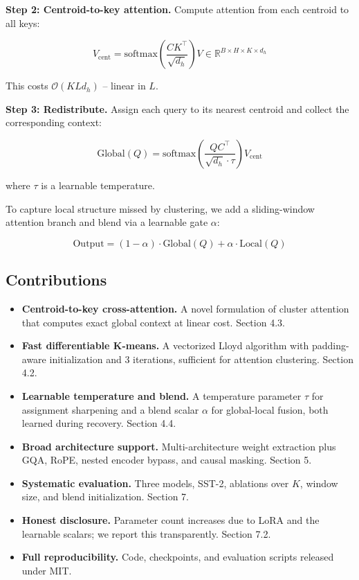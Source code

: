 \textbf{Step 2: Centroid-to-key attention.} Compute attention from each centroid 
to all keys:

\[
V_{\text{cent}} = \text{softmax}\!\left(\frac{C K^\top}{\sqrt{d_h}}\right) V \in \mathbb{R}^{B \times H \times K \times d_h}
\]

This costs $\mathcal{O}(K L d_h)$ -- linear in $L$.

\textbf{Step 3: Redistribute.} Assign each query to its nearest centroid and 
collect the corresponding context:

\[
\text{Global}(Q) = \text{softmax}\!\left(\frac{Q C^\top}{\sqrt{d_h} \cdot \tau}\right) V_{\text{cent}}
\]

where $\tau$ is a learnable temperature.

To capture local structure missed by clustering, we add a sliding-window 
attention branch and blend via a learnable gate $\alpha$:

\[
\text{Output} = (1 - \alpha) \cdot \text{Global}(Q) + \alpha \cdot \text{Local}(Q)
\]

\subsection{Contributions}

\begin{itemize}
\item \textbf{Centroid-to-key cross-attention.} A novel formulation of cluster
  attention that computes exact global context at linear cost. Section 4.3.
\item \textbf{Fast differentiable K-means.} A vectorized Lloyd algorithm with
  padding-aware initialization and 3 iterations, sufficient for attention
  clustering. Section 4.2.
\item \textbf{Learnable temperature and blend.} A temperature parameter $\tau$ for
  assignment sharpening and a blend scalar $\alpha$ for global-local fusion,
  both learned during recovery. Section 4.4.
\item \textbf{Broad architecture support.} Multi-architecture weight extraction plus
  GQA, RoPE, nested encoder bypass, and causal masking. Section 5.
\item \textbf{Systematic evaluation.} Three models, SST-2, ablations over $K$,
  window size, and blend initialization. Section 7.
\item \textbf{Honest disclosure.} Parameter count increases due to LoRA and the
  learnable scalars; we report this transparently. Section 7.2.
\item \textbf{Full reproducibility.} Code, checkpoints, and evaluation scripts
  released under MIT.

\end{itemize}
